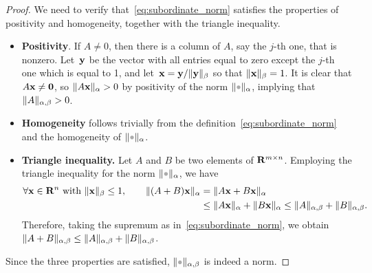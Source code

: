\begin{proof}
    We need to verify that~\eqref{eq:subordinate_norm} satisfies the properties of positivity and homogeneity,
    together with the triangle inequality.
    \begin{itemize}
        \item
            \textbf{Positivity}. If $A \neq 0$,
            then there is a column of $A$, say the $j$-th one, that is nonzero.
            Let~$\mathbf y$ be the vector with all entries equal to zero except the $j$-th one which is equal to 1,
            and let~$\mathbf x = \mathbf y / \lVert\mathbf y\rVert_{\beta}$ so that $\lVert\mathbf x\rVert_{\beta} = 1$.
            It is clear that $A \mathbf x \neq \mathbf 0$,
            so $\lVert A \mathbf x\rVert_{\alpha} > 0$ by positivity of the norm $\norm{\placeholder}_{\alpha}$,
            implying that $\lVert A\rVert_{\alpha,\beta} > 0$.

        \item
            \textbf{Homogeneity} follows trivially from the definition~\eqref{eq:subordinate_norm}
            and the homogeneity of $\norm{\placeholder}_{\alpha}$.

        \item
            \textbf{Triangle inequality.}
            Let $A$ and $B$ be two elements of $\mathbf R^{m \times n}$.
            Employing the triangle inequality for the norm $\norm{\placeholder}_{\alpha}$,
            we have
            \begin{align*}
                \forall \mathbf x \in \mathbf R^{n} ~ \text{with} ~ \lVert\mathbf x\rVert_{\beta}\leq 1, \qquad
                \lVert(A + B) \mathbf x\rVert_{\alpha}
                &= \lVert A \mathbf x + B \mathbf x\rVert_{\alpha} \\
                &\leq \lVert A \mathbf x\rVert_{\alpha} + \lVert B \mathbf x\rVert_{\alpha}
                \leq \lVert A\rVert_{\alpha,\beta} + \lVert B\rVert_{\alpha,\beta}.
            \end{align*}
            Therefore, taking the supremum as in~\eqref{eq:subordinate_norm},
            we obtain $\lVert A+B\rVert_{\alpha,\beta} \leq \lVert A\rVert_{\alpha,\beta} + \lVert B\rVert_{\alpha,\beta}$.
    \end{itemize}
    Since the three properties are satisfied, $\norm{\placeholder}_{\alpha,\beta}$ is indeed a norm.
\end{proof}

